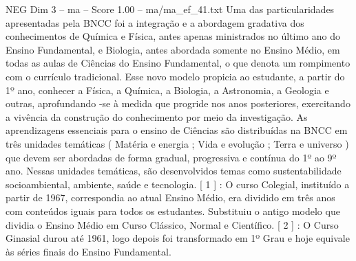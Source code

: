 \begin{textsample}{NEG Dim 3 – ma – Score 1.00 – ma/ma\_ef\_41.txt}
Uma das particularidades apresentadas pela BNCC foi a integração e a abordagem gradativa dos conhecimentos de Química e Física, antes apenas ministrados no último ano do Ensino Fundamental, e Biologia, antes abordada somente no Ensino Médio, em todas as aulas de Ciências do Ensino Fundamental, o que denota um rompimento com o currículo tradicional.
Esse novo modelo propicia ao estudante, a partir do 1º ano, conhecer a Física, a Química, a Biologia, a Astronomia, a Geologia e outras, aprofundando -se à medida que progride nos anos posteriores, exercitando a vivência da construção do conhecimento por meio da investigação.
As aprendizagens essenciais para o ensino de Ciências são distribuídas na BNCC em três unidades temáticas ( Matéria e energia ; Vida e evolução ; Terra e universo ) que devem ser abordadas de forma gradual, progressiva e contínua do 1º ao 9º ano.
Nessas unidades temáticas, são desenvolvidos temas como sustentabilidade socioambiental, ambiente, saúde e tecnologia. [ 1 ] : O curso Colegial, instituído a partir de 1967, correspondia ao atual Ensino Médio, era dividido em três anos com conteúdos iguais para todos os estudantes.
Substituiu o antigo modelo que dividia o Ensino Médio em Curso Clássico, Normal e Científico. [ 2 ] : O Curso Ginasial durou até 1961, logo depois foi transformado em 1º Grau e hoje equivale às séries finais do Ensino Fundamental.

\end{textsample}
